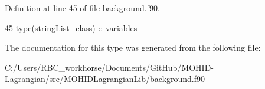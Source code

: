 Definition at line 45 of file background.\+f90.


\begin{DoxyCode}
45         \textcolor{keywordtype}{type}(stringList\_class) :: variables
\end{DoxyCode}


The documentation for this type was generated from the following file\+:\begin{DoxyCompactItemize}
\item 
C\+:/\+Users/\+R\+B\+C\+\_\+workhorse/\+Documents/\+Git\+Hub/\+M\+O\+H\+I\+D-\/\+Lagrangian/src/\+M\+O\+H\+I\+D\+Lagrangian\+Lib/\mbox{\hyperlink{background_8f90}{background.\+f90}}\end{DoxyCompactItemize}
